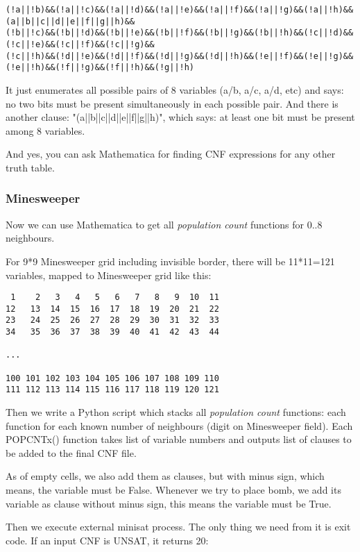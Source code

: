\begin{lstlisting}
(!a||!b)&&(!a||!c)&&(!a||!d)&&(!a||!e)&&(!a||!f)&&(!a||!g)&&(!a||!h)&&(a||b||c||d||e||f||g||h)&&
(!b||!c)&&(!b||!d)&&(!b||!e)&&(!b||!f)&&(!b||!g)&&(!b||!h)&&(!c||!d)&&(!c||!e)&&(!c||!f)&&(!c||!g)&&
(!c||!h)&&(!d||!e)&&(!d||!f)&&(!d||!g)&&(!d||!h)&&(!e||!f)&&(!e||!g)&&(!e||!h)&&(!f||!g)&&(!f||!h)&&(!g||!h)
\end{lstlisting}

It just enumerates all possible pairs of 8 variables (a/b, a/c, a/d, etc) and says: no two bits must be present
simultaneously in each possible pair.
And there is another clause: "(a||b||c||d||e||f||g||h)", which says: at least one bit must be present among 8 variables.

And yes, you can ask Mathematica for finding CNF expressions for any other truth table.

\subsubsection{Minesweeper}

Now we can use Mathematica to get all \textit{population count} functions for 0..8 neighbours.

For 9*9 Minesweeper grid including invisible border, there will be 11*11=121 variables, mapped to Minesweeper grid like this:

\begin{lstlisting}
 1    2   3   4   5   6   7   8   9  10  11
12   13  14  15  16  17  18  19  20  21  22
23   24  25  26  27  28  29  30  31  32  33
34   35  36  37  38  39  40  41  42  43  44

...

100 101 102 103 104 105 106 107 108 109 110
111 112 113 114 115 116 117 118 119 120 121
\end{lstlisting}

Then we write a Python script which stacks all \textit{population count} functions: each function for each known number of neighbours (digit on Minesweeper field).
Each POPCNTx() function takes list of variable numbers and outputs list of clauses to be added to the final CNF file.

As of empty cells, we also add them as clauses, but with minus sign, which means, the variable must be False.
Whenever we try to place bomb, we add its variable as clause without minus sign, this means the variable must be True.

Then we execute external minisat process.
The only thing we need from it is exit code.
If an input CNF is UNSAT, it returns 20:

